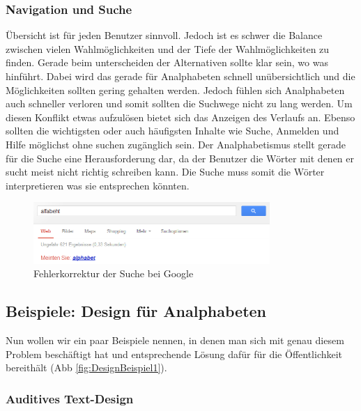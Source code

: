 \subsubsection{Navigation und Suche}
Übersicht ist für jeden Benutzer sinnvoll. Jedoch ist es schwer die Balance zwischen vielen Wahlmöglichkeiten und der Tiefe der Wahlmöglichkeiten zu finden. Gerade beim unterscheiden der Alternativen sollte klar sein, wo was hinführt. Dabei wird das gerade für Analphabeten schnell unübersichtlich und die Möglichkeiten sollten gering gehalten werden. Jedoch fühlen sich Analphabeten auch schneller verloren und somit sollten die Suchwege nicht zu lang werden. Um diesen Konflikt etwas aufzulösen bietet sich das Anzeigen des Verlaufs an. Ebenso sollten die wichtigsten oder auch häufigsten Inhalte wie Suche, Anmelden und Hilfe möglichst ohne suchen zugänglich sein. Der Analphabetismus stellt gerade für die Suche eine Herausforderung dar, da der Benutzer die Wörter mit denen er sucht meist nicht richtig schreiben kann. Die Suche muss somit die Wörter interpretieren was sie entsprechen könnten.
\begin{figure}[h]
	\centering
		\includegraphics[width=0.80\textwidth]{Daten/rechtschreibung.png}
	\caption{Fehlerkorrektur der Suche bei Google}
	\label{fig:GoogleSearch}
\end{figure}

\subsection{Beispiele: Design für Analphabeten}

Nun wollen wir ein paar Beispiele nennen, in denen man sich mit genau diesem Problem beschäftigt hat und entsprechende Lösung dafür für die Öffentlichkeit bereithält (Abb \ref{fig:DesignBeispiel1}).

\subsubsection{Auditives Text-Design}

